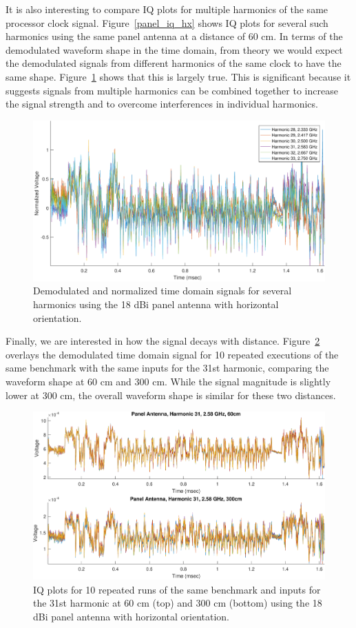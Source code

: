It is also interesting to compare IQ plots for multiple harmonics of the same processor clock signal. Figure~\ref{panel_iq_hx} shows IQ plots for several such harmonics using the same panel antenna at a distance of 60 cm. In terms of the demodulated waveform shape in the time domain, from theory we would expect the demodulated signals from different harmonics of the same clock to have the same shape. Figure~\ref{panel_abs_hx} shows that this is largely true. This is significant because it suggests signals from multiple harmonics can be combined together to increase the signal strength and to overcome interferences in individual harmonics. 

\begin{figure}
\includegraphics[width=\textwidth]{panel_abs_hx}
\caption{Demodulated and normalized time domain signals for several harmonics using the 18 dBi panel antenna with horizontal orientation.}
\label{panel_abs_hx}
\end{figure}

Finally, we are interested in how the signal decays with distance. Figure~\ref{panel_abs_h31_cm} overlays the demodulated time domain signal for 10 repeated executions of the same benchmark with the same inputs for the 31st harmonic, comparing the waveform shape at 60 cm and 300 cm. While the signal magnitude is slightly lower at 300 cm, the overall waveform shape is similar for these two distances. 

\begin{figure}
\includegraphics[width=\textwidth]{panel_abs_h31_cm}
\caption{IQ plots for 10 repeated runs of the same benchmark and inputs for the 31st harmonic at 60 cm (top) and 300 cm (bottom)  using the 18 dBi panel antenna with horizontal orientation.}
\label{panel_abs_h31_cm}
\end{figure}

